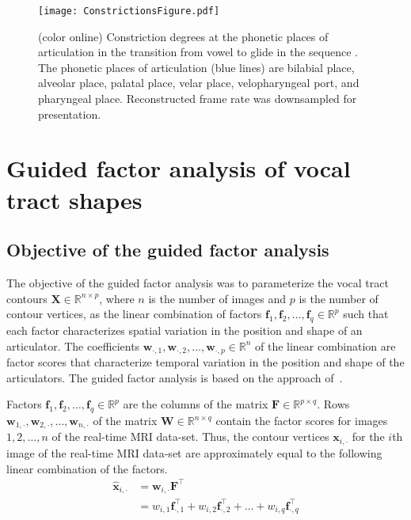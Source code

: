 \documentclass[preprint]{JASAnew}\usepackage[]{graphicx}\usepackage[]{color}
\begin{document}
\begin{figure}

\texttt{[image: ConstrictionsFigure.pdf]}

\caption{(color online) Constriction degrees at the phonetic places of articulation in the transition from vowel \textipa{[a]} to glide \textipa{[j]} in the sequence \textipa{[aja]}. The phonetic places of articulation (blue lines) are bilabial place, alveolar place, palatal place, velar place, velopharyngeal port, and pharyngeal place. Reconstructed frame rate was downsampled for presentation.}
\label{fig:constrictions}
\end{figure}




\section{Guided factor analysis of vocal tract shapes}
\label{sec:gfa}




\subsection{Objective of the guided factor analysis}
\label{subsec:objectivesoftheguidedfactoranalysis}

The objective of the guided factor analysis was to parameterize the vocal tract contours $\mathbf{X} \in \mathbb{R}^{n\times p}$, where $n$ is the number of images and $p$ is the number of contour vertices, as the linear combination of factors $\mathbf{f}_1, \mathbf{f}_2, \ldots, \mathbf{f}_q \in \mathbb{R}^p$ such that each factor characterizes spatial variation in the position and shape of an articulator. 
%
The coefficients $\mathbf{w}_{\cdot,1},\mathbf{w}_{\cdot,2},\ldots,\mathbf{w}_{\cdot,p} \in \mathbb{R}^n$ of the linear combination are factor scores that characterize temporal variation in the position and shape of the articulators. 
%
The guided factor analysis is based on the approach of~\citet{toutios2015factor}.


Factors $\mathbf{f}_1, \mathbf{f}_2, \ldots, \mathbf{f}_q \in \mathbb{R}^p$ are the columns of the matrix $\mathbf{F} \in \mathbb{R}^{p\times q}$. 
%
Rows $\mathbf{w}_{1,\cdot},\mathbf{w}_{2,\cdot},\ldots,\mathbf{w}_{n,\cdot}$ of the matrix $\mathbf{W} \in \mathbb{R}^{n\times q}$ contain the factor scores for images $1,2,\ldots,n$ of the real-time MRI data-set. 
%
Thus, the contour vertices $\mathbf{x}_{i,\cdot}$ for the $i$th image of the real-time MRI data-set are approximately equal to the following linear combination of the factors. 
%
\begin{align}
\label{eq:linearcombo}
\mathbf{\hat{x}}_{i,\cdot}
 &=
  \mathbf{w}_{i,\cdot} \mathbf{F}^\intercal \\
 &=
  w_{i,1} \mathbf{f}_{\cdot,1}^\intercal
  + w_{i,2} \mathbf{f}_{\cdot,2}^\intercal
  + \ldots
  + w_{i,q} \mathbf{f}_{\cdot,q}^\intercal
\end{align}
\end{document}
